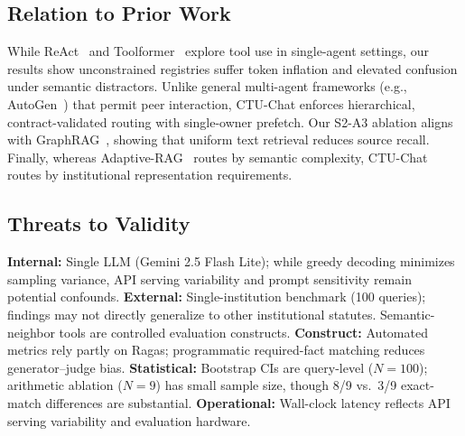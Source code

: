 \subsection{Relation to Prior Work}

While ReAct~\cite{yao2023react} and Toolformer~\cite{schick2023toolformer} explore tool use in single-agent settings, our results show unconstrained registries suffer token inflation and elevated confusion under semantic distractors. Unlike general multi-agent frameworks (e.g., AutoGen~\cite{wu2023autogen}) that permit peer interaction, CTU-Chat enforces hierarchical, contract-validated routing with single-owner prefetch. Our S2-A3 ablation aligns with GraphRAG~\cite{edge2024graphrag}, showing that uniform text retrieval reduces source recall. Finally, whereas Adaptive-RAG~\cite{jeong2024adaptiverag} routes by semantic complexity, CTU-Chat routes by institutional representation requirements.

\subsection{Threats to Validity}
\label{sec:limitations}
\textbf{Internal:} Single LLM (Gemini 2.5 Flash Lite); while greedy decoding minimizes sampling variance, API serving variability and prompt sensitivity remain potential confounds. \textbf{External:} Single-institution benchmark (100 queries); findings may not directly generalize to other institutional statutes. Semantic-neighbor tools are controlled evaluation constructs. \textbf{Construct:} Automated metrics rely partly on Ragas; programmatic required-fact matching reduces generator--judge bias. \textbf{Statistical:} Bootstrap CIs are query-level ($N{=}100$); arithmetic ablation ($N{=}9$) has small sample size, though 8/9 vs.\ 3/9 exact-match differences are substantial. \textbf{Operational:} Wall-clock latency reflects API serving variability and evaluation hardware.

